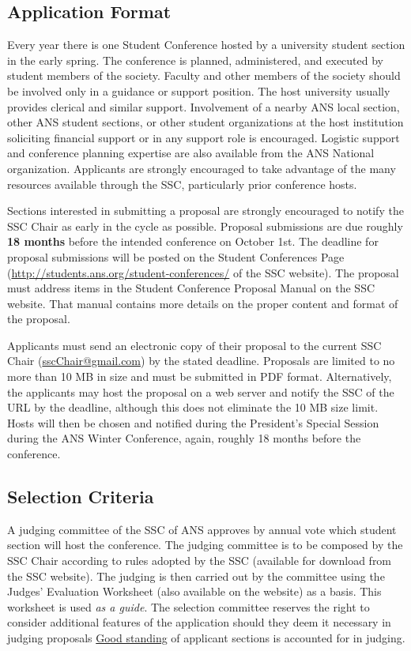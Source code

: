 \documentclass[12pt]{article}
\begin{document}
\subsection{Application Format}
Every year there is one Student Conference hosted by a university student section in the early spring.
The conference is planned, administered, and executed by student members of the society.
Faculty and other members of the society should be involved only in a guidance or support position.
The host university usually provides clerical and similar support.
Involvement of a nearby ANS local section, other ANS student sections, or other student organizations at the host institution soliciting financial support or in any support role is encouraged.
Logistic support and conference planning expertise are also available from the ANS National organization.
Applicants are strongly encouraged to take advantage of the many resources available through the SSC, particularly prior conference hosts.

Sections interested in submitting a proposal are strongly encouraged to notify the SSC Chair as early in the cycle as possible.
Proposal submissions are due roughly \textbf{18 months} before the intended conference on October 1st.
The deadline for proposal submissions will be posted on the Student Conferences Page (\href{http://students.ans.org/student-conferences/}{http://students.ans.org/student-conferences/}  of the SSC website).
The proposal must address items in the Student Conference Proposal Manual on the SSC website.
That manual contains more details on the proper content and format of the proposal.

Applicants must send an electronic copy of their proposal to the current SSC Chair (\href{mailto:sscChair@gmail.com}{sscChair@gmail.com}) by the stated deadline.
Proposals are limited to no more than 10 MB in size and must be submitted in PDF format.
Alternatively, the applicants may host the proposal on a web server and notify the SSC of the URL by the deadline, although this does not eliminate the 10 MB size limit.
Hosts will then be chosen and notified during the President's Special Session during the ANS Winter Conference, again, roughly 18 months before the conference.

\subsection{Selection Criteria}
A judging committee of the SSC of ANS approves by annual vote which student section will host the conference.
The judging committee is to be composed by the SSC Chair according to rules adopted by the SSC (available for download from the SSC website).
The judging is then carried out by the committee using the Judges' Evaluation Worksheet (also available on the website) as a basis.
This worksheet is used \emph{as a guide}.
The selection committee reserves the right to consider additional features of the application should they deem it necessary in judging proposals
\href{http://students.ans.org/section-standing/}{Good standing} of applicant sections is accounted for in judging.
\end{document}
